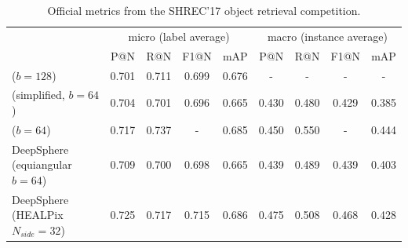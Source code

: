 \documentclass{article} %
\newcommand{\todo}[1]{{\color[rgb]{.6,.1,.6}{#1}}}
\begin{document}
\begin{table}
    \centering
	\scriptsize
    \begin{tabular}{l cccc cccc}
    & \multicolumn{4}{c}{micro (label average)} & \multicolumn{4}{c}{macro (instance average)} \\
	\cmidrule(lr){2-5} \cmidrule(lr){6-9}
    & P@N & R@N & F1@N & mAP & P@N & R@N & F1@N & mAP \\
	\toprule
    \citet{cohen2018sphericalcnn} ($b=128$) & 0.701 & 0.711 & 0.699 & 0.676 & - & - & - & - \\
    \citet{cohen2018sphericalcnn} (simplified, $b=64$) & 0.704 & 0.701 & 0.696 & 0.665 & 0.430 & 0.480 & 0.429 & 0.385 \\
    \citet{esteves2018sphericalcnn} ($b=64$) & 0.717 & 0.737 & - & 0.685 & 0.450 & 0.550 & - & 0.444 \\
    DeepSphere (equiangular $b=64$) & 0.709 & 0.700 & 0.698 & 0.665 & 0.439 & 0.489 & 0.439 & 0.403 \\
    DeepSphere (HEALPix $N_{side}=32$) & 0.725 & 0.717 & 0.715 & 0.686 & 0.475 & 0.508 & 0.468 & 0.428\\
	\bottomrule
    \end{tabular}
    \caption{Official metrics from the SHREC'17 object retrieval competition.}
    \label{tab:shrec17_retrieval}
\end{table}

\end{document}
